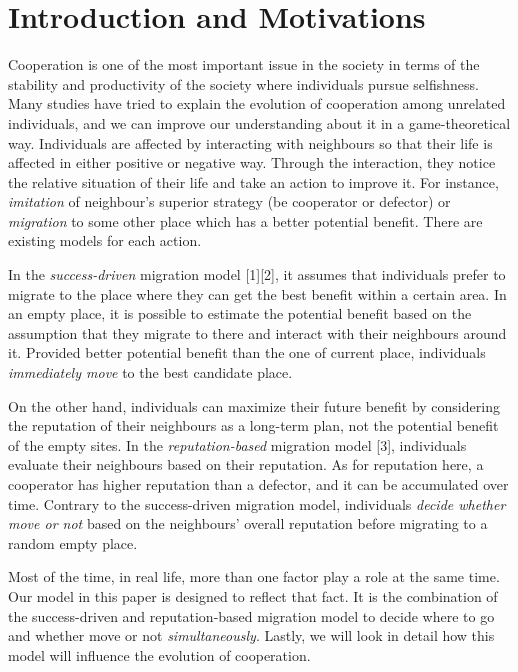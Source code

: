 \documentclass[11pt]{article}
\begin{document}
\newpage
\section{Introduction and Motivations}

Cooperation is one of the most important issue in the society in terms of the stability and productivity of the society where individuals pursue selfishness. Many studies have tried to explain the evolution of cooperation among unrelated individuals, and we can improve our understanding about it in a game-theoretical way. Individuals are affected by interacting with neighbours so that their life is affected in either positive or negative way. Through the interaction, they notice the relative situation of their life and take an action to improve it. For instance, \textit{imitation} of neighbour's superior strategy (be cooperator or defector) or \textit{migration} to some other place which has a better potential benefit. There are existing models for each action.

In the \textit{success-driven} migration model [1][2], it assumes that individuals prefer to migrate to the place where they can get the best benefit within a certain area. In an empty place, it is possible to estimate the potential benefit based on the assumption that they migrate to there and interact with their neighbours around it. Provided better potential benefit than the one of current place, individuals \textit{immediately move} to the best candidate place.  

On the other hand, individuals can maximize their future benefit by considering the reputation of their neighbours as a long-term plan, not the potential benefit of the empty sites. In the \textit{reputation-based} migration model [3], individuals evaluate their neighbours based on their reputation. As for reputation here, a cooperator has higher reputation than a defector, and it can be accumulated over time. Contrary to the success-driven migration model, individuals \textit{decide whether move or not} based on the neighbours' overall reputation before migrating to a random empty place.

Most of the time, in real life, more than one factor play a role at the same time. Our model in this paper is designed to reflect that fact. It is the combination of the success-driven and reputation-based migration model to decide where to go and whether move or not \textit{simultaneously}. Lastly, we will look in detail how this model will influence the evolution of cooperation.
\end{document}
